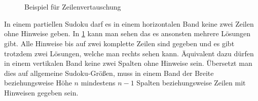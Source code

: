 \begin{figure}[H]
\begin{minipage}{0.48\textwidth}
        \\
        \\

    \end{minipage}
    \caption{Beispiel für Zeilenvertauschung}
    \label{fig:row_constraints}
\end{figure}

In einem partiellen Sudoku darf es in einem horizontalen Band keine zwei Zeilen ohne Hinweise geben.
In \cref{fig:row_constraints} kann man sehen das es ansonsten mehrere Lösungen gibt.
Alle Hinweise bis auf zwei komplette Zeilen sind gegeben und es gibt trotzdem zwei Lösungen, welche man rechts sehen kann.
Äquivalent dazu dürfen in einem vertikalen Band keine zwei Spalten ohne Hinweise sein.
Übersetzt man dies auf allgemeine Sudoku-Größen,
muss in einem Band der Breite beziehungsweise Höhe $n$ mindestens $n-1$ Spalten beziehungsweise Zeilen mit Hinweisen gegeben sein.

